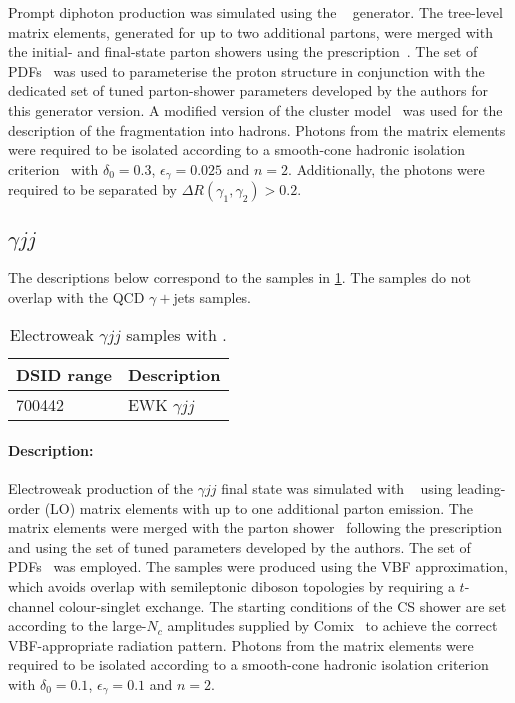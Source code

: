 Prompt diphoton production was simulated using the \SHERPA[2.1]~\cite{Bothmann:2019yzt}
generator. The tree-level matrix elements, generated for up to two
additional partons, were merged with the initial- and final-state parton showers using the
\MEPSatLO prescription~\cite{Hoeche:2009rj}. The \CT[10nlo] set of PDFs~\cite{Lai:2010vv} was
used to parameterise the proton structure in conjunction with the dedicated set of tuned
parton-shower parameters developed by the \SHERPA authors for this generator version. A
modified version of the cluster model~\cite{Winter:2003tt} was used
for the description of the fragmentation into hadrons. Photons from the matrix elements were
required to be isolated according to a smooth-cone hadronic isolation criterion~\cite{Frixione:1998jh}
with \(\delta_0=0.3\), \(\epsilon_{\gamma}=0.025\) and \(n=2\). Additionally, the photons were
required to be separated by \(\Delta R(\gamma_1,\gamma_2) > 0.2\).


\subsection[yjj]{ \(\gamma jj\)}

The descriptions below correspond to the samples in
\cref{tab:ewkyjets-sherpa}. The samples do not overlap with the QCD \(\gamma+\)jets samples.

\begin{table}[!htbp]
  \caption{Electroweak \(\gamma jj\) samples with \SHERPA.}%
  \label{tab:ewkyjets-sherpa}
  \centering
  \begin{tabular}{l l}
    \toprule
    DSID range & Description \\
    \midrule
    700442 & EWK \(\gamma jj\) \\
    \bottomrule
  \end{tabular}
\end{table}

\paragraph{Description:}

Electroweak production of the \(\gamma jj\) final state
was simulated with \SHERPA[2.2.11]~\cite{Bothmann:2019yzt} using
leading-order (LO) matrix elements with up to one additional parton emission.
The matrix elements were merged with the \SHERPA parton
shower~\cite{Schumann:2007mg} following the \MEPSatLO
prescription~\cite{Catani:2001cc} and using the set of tuned
parameters developed by the \SHERPA authors.
The \NNPDF[3.0nnlo] set of
PDFs~\cite{Ball:2014uwa} was employed. The samples were produced
using the VBF approximation, which avoids overlap with semileptonic
diboson topologies by requiring a \(t\)-channel colour-singlet exchange.
The starting conditions of the CS shower are set according to the
large-\(N_c\) amplitudes supplied by Comix~\cite{Buckley:2021gfw} to achieve
the correct VBF-appropriate radiation pattern.
Photons from the matrix elements were required to be isolated according to a smooth-cone 
hadronic isolation criterion~\cite{Frixione:1998jh} with 
\(\delta_0=0.1\), \(\epsilon_{\gamma}=0.1\) and \(n=2\).



